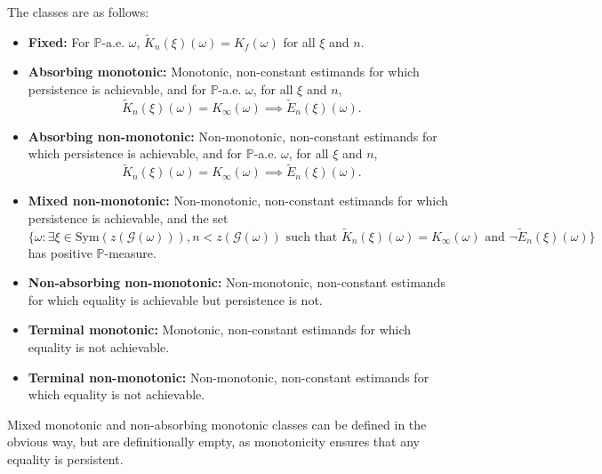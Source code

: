 \documentclass{article}
\begin{document}
The classes are as follows:
\begin{itemize}
    \item \textbf{Fixed:} For $\mathbb{P}$-a.e. $\omega$, $\widetilde K_n(\xi)(\omega) = K_f(\omega)$ for all $\xi$ and $n$.
    \item \textbf{Absorbing monotonic:} Monotonic, non-constant estimands for which persistence is achievable, and for $\mathbb{P}$-a.e. $\omega$, for all $\xi$ and $n$,
    \[
    \widetilde K_n(\xi)(\omega) = K_\infty(\omega) \implies \widetilde E_n(\xi)(\omega).
    \]
    \item \textbf{Absorbing non-monotonic:} Non-monotonic, non-constant estimands for which persistence is achievable, and for $\mathbb{P}$-a.e. $\omega$, for all $\xi$ and $n$,
    \[
    \widetilde K_n(\xi)(\omega) = K_\infty(\omega) \implies \widetilde E_n(\xi)(\omega).
    \]
    \item \textbf{Mixed non-monotonic:} Non-monotonic, non-constant estimands for which persistence is achievable, and the set
    \[
    \{\omega : \exists \xi \in \mathrm{Sym}(z(\mathcal{G}(\omega))), n < z(\mathcal{G}(\omega)) \text{ such that } \widetilde K_n(\xi)(\omega)=K_\infty(\omega) \text{ and } \lnot\widetilde E_n(\xi)(\omega)\}
    \]
    has positive $\mathbb{P}$-measure.
    \item \textbf{Non-absorbing non-monotonic:} Non-monotonic, non-constant estimands for which equality is achievable but persistence is not.
    \item \textbf{Terminal monotonic:} Monotonic,  non-constant estimands for which equality is not achievable.
    \item \textbf{Terminal non-monotonic:} Non-monotonic, non-constant estimands for which equality is not achievable.
\end{itemize}

Mixed monotonic and non-absorbing monotonic classes can be defined in the obvious way, but are definitionally empty, as monotonicity ensures that any equality is persistent.
\end{document}
